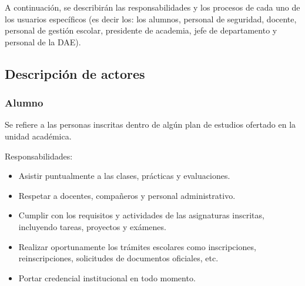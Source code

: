 A continuación, se describirán las responsabilidades y los procesos de cada uno de los usuarios específicos (es decir los: los alumnos, personal de seguridad, docente, personal de gestión escolar, presidente de academia, jefe de departamento y personal de la DAE).








\subsection{Descripción de actores}

\begin{Usuario}{\hypertarget{tAlumno}{\subsubsection{Alumno}}}{
		Se refiere a las personas inscritas dentro de algún plan de estudios ofertado en la unidad académica.
	}
	\item[Responsabilidades:] \cdtEmpty
	\begin{itemize}
		\item Asistir puntualmente a las clases, prácticas y evaluaciones.
		\item Respetar a docentes, compañeros y personal administrativo.
		\item Cumplir con los requisitos y actividades de las asignaturas inscritas, incluyendo tareas, proyectos y exámenes.
		\item Realizar oportunamente los trámites escolares como inscripciones, reinscripciones, solicitudes de documentos oficiales, etc.
		\item Portar credencial institucional en todo momento.
	\end{itemize}
	

\end{Usuario}

